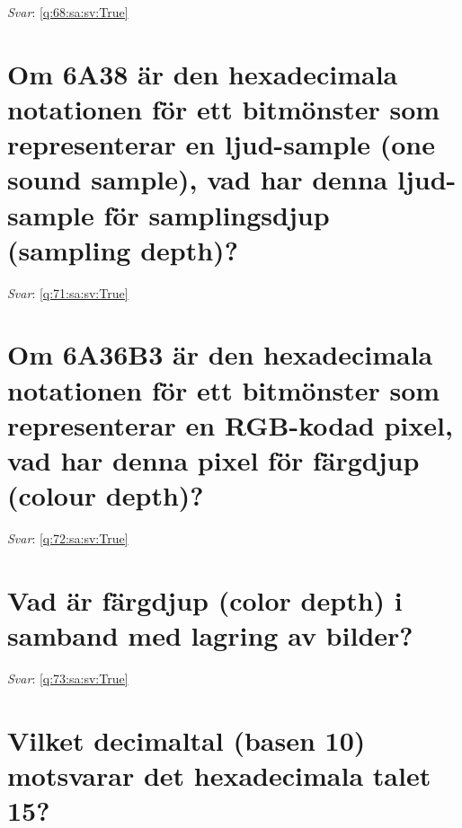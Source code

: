 \documentclass[a4paper,11pt,oneside]{book}
\begin{document}
\begin{sloppypar}
\textit{Svar}: \autoref{q:68:sa:sv:True}



\section{Om 6A38 \"ar den hexadecimala notationen f\"or ett bitm\"onster som representerar en ljud-sample (one sound sample), vad har denna ljud-sample f\"or samplingsdjup (sampling depth)?}

\label{q:71:sa:sv:False}

\vspace{2cm}

\noindent\makebox[\textwidth]{\hrulefill}

\vspace{1cm}

\textit{Svar}: \autoref{q:71:sa:sv:True}



\section{Om 6A36B3 \"ar den hexadecimala notationen f\"or ett bitm\"onster som representerar en RGB-kodad pixel, vad har denna pixel f\"or f\"argdjup (colour depth)?}

\label{q:72:sa:sv:False}

\vspace{2cm}

\noindent\makebox[\textwidth]{\hrulefill}

\vspace{1cm}

\textit{Svar}: \autoref{q:72:sa:sv:True}



\section{Vad \"ar f\"argdjup (color depth) i samband med lagring av bilder?}

\label{q:73:sa:sv:False}

\vspace{2cm}

\noindent\makebox[\textwidth]{\hrulefill}

\vspace{1cm}

\textit{Svar}: \autoref{q:73:sa:sv:True}



\section{Vilket decimaltal (basen 10) motsvarar det hexadecimala talet 15?}


\end{sloppypar}
\end{document}
